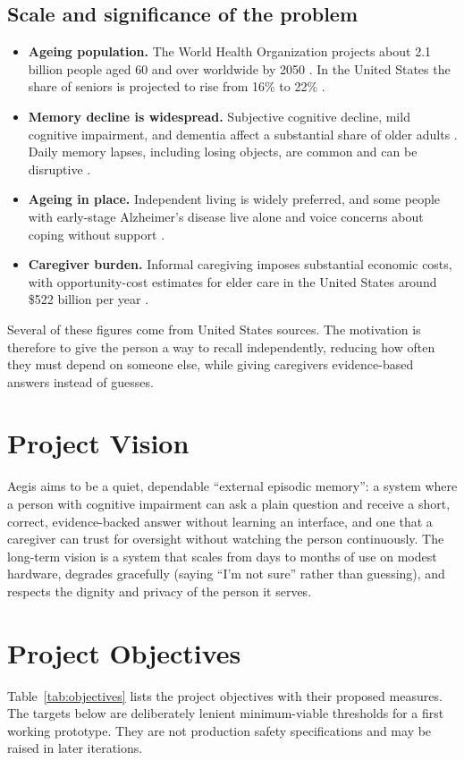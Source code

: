 \subsection*{Scale and significance of the problem}
\begin{itemize}
\item \textbf{Ageing population.} The World Health Organization projects about
2.1 billion people aged 60 and over worldwide by 2050 \cite{who2024}. In the
United States the share of seniors is projected to rise from 16\% to 22\%
\cite{statista2022}.
\item \textbf{Memory decline is widespread.} Subjective cognitive decline, mild
cognitive impairment, and dementia affect a substantial share of older adults
\cite{alz2023}. Daily memory lapses, including losing objects, are common and can be
disruptive \cite{mogle2023,marchant2011}.
\item \textbf{Ageing in place.} Independent living is widely preferred, and some
people with early-stage Alzheimer's disease live alone and voice concerns about
coping without support \cite{harris2006}.
\item \textbf{Caregiver burden.} Informal caregiving imposes substantial economic costs, with opportunity-cost estimates for elder care in the United States around \$522 billion per year \cite{chari2015}.
\end{itemize}

Several of these figures come from United States sources. The motivation is
therefore to give the person a way to recall independently, reducing how often
they must depend on someone else, while giving caregivers evidence-based
answers instead of guesses. 

\section{Project Vision}
Aegis aims to be a quiet, dependable ``external episodic memory'': a system
where a person with cognitive impairment can ask a plain question and receive a
short, correct, evidence-backed answer without learning an interface, and one
that a caregiver can trust for oversight without watching the person
continuously. The long-term vision is a system that scales from days to months
of use on modest hardware, degrades gracefully (saying ``I'm not sure'' rather
than guessing), and respects the dignity and privacy of the person it serves.

\section{Project Objectives}
Table~\ref{tab:objectives} lists the project objectives with their proposed
measures. The targets below are deliberately lenient minimum-viable thresholds for a first working prototype. They are not production safety specifications and may be raised in later iterations.

